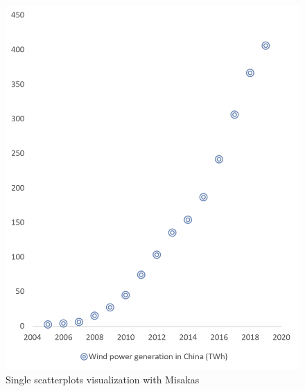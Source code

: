 \documentclass[conference]{IEEEtran}
\begin{document}
\begin{figure}
    \begin{minipage}{0.49\columnwidth}
      \centering
      \includegraphics[width=0.99\columnwidth]{scatterplots00.png}
      \caption{Single scatterplots visualization with Misakas}
      \label{fig:Single}
    \end{minipage}\hfill
    \begin{minipage}{0.49\columnwidth}
      \centering

\end{minipage}
\end{figure}
\end{document}
